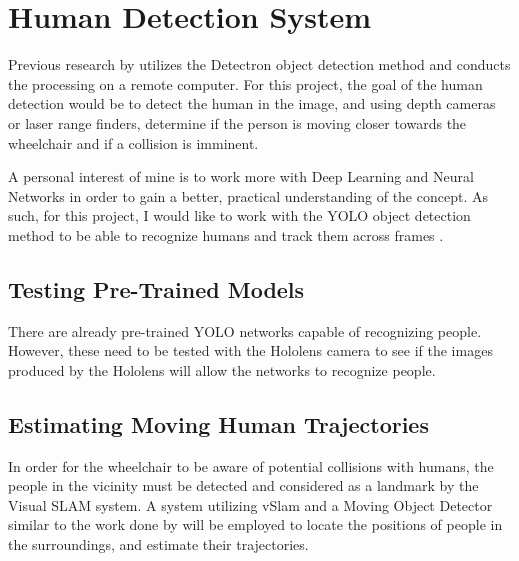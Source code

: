 \documentclass[12pt,a4paper]{report}
\begin{document}
\section{Human Detection System} \label{section:HDS}
Previous research by \cite{Chacon-Quesada} utilizes the Detectron object detection method \citep{Detectron2018} and conducts the processing on a remote computer. For this project, the goal of the human detection would be to detect the human in the image, and using depth cameras or laser range finders, determine if the person is moving closer towards the wheelchair and if a collision is imminent.

A personal interest of mine is to work more with Deep Learning and Neural Networks in order to gain a better, practical understanding of the concept. As such, for this project, I would like to work with the YOLO object detection method to be able to recognize humans and track them across frames \citep{Shinde2018, Redmon2015}.

\subsection{Testing Pre-Trained Models}
There are already pre-trained YOLO networks capable of recognizing people. However, these need to be tested with the Hololens camera to see if the images produced by the Hololens will allow the networks to recognize people.

\subsection{Estimating Moving Human Trajectories}
In order for the wheelchair to be aware of potential collisions with humans, the people in the vicinity must be detected and considered as a landmark by the Visual SLAM system. A system utilizing vSlam and a Moving Object Detector similar to the work done by \cite{Wang2011} will be employed to locate the positions of people in the surroundings, and estimate their trajectories.
\end{document}
